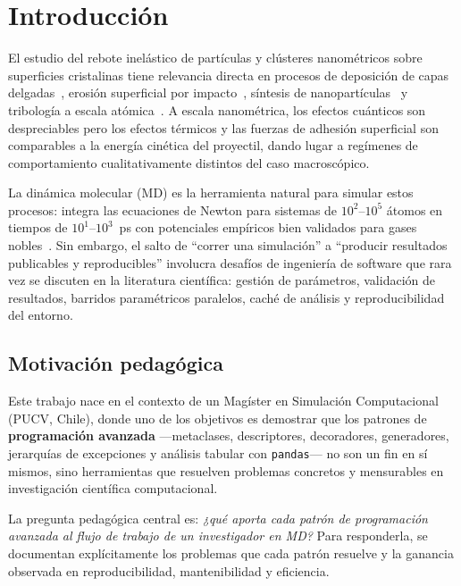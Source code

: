 \section{Introducción}

El estudio del rebote inelástico de partículas y clústeres nanométricos sobre
superficies cristalinas tiene relevancia directa en procesos de deposición de
capas delgadas~\cite{Yamaguchi1992}, erosión superficial por impacto~\cite{Zimmermann2021},
síntesis de nanopartículas~\cite{Kluge2020} y tribología a escala
atómica~\cite{Szlufarska2008}. A escala nanométrica, los efectos cuánticos son
despreciables pero los efectos térmicos y las fuerzas de adhesión superficial
son comparables a la energía cinética del proyectil, dando lugar a regímenes de
comportamiento cualitativamente distintos del caso macroscópico.

La dinámica molecular (MD) es la herramienta natural para simular estos procesos:
integra las ecuaciones de Newton para sistemas de $10^2$--$10^5$ átomos en
tiempos de $10^{1}$--$10^3$~ps con potenciales empíricos bien validados para
gases nobles~\cite{Lennard-Jones1931}. Sin embargo, el salto de ``correr una
simulación'' a ``producir resultados publicables y reproducibles'' involucra
desafíos de ingeniería de software que rara vez se discuten en la literatura
científica: gestión de parámetros, validación de resultados, barridos
paramétricos paralelos, caché de análisis y reproducibilidad del entorno.

\subsection{Motivación pedagógica}

Este trabajo nace en el contexto de un Magíster en Simulación Computacional
(PUCV, Chile), donde uno de los objetivos es demostrar que los patrones de
\textbf{programación avanzada} ---metaclases, descriptores, decoradores,
generadores, jerarquías de excepciones y análisis tabular con
\texttt{pandas}--- no son un fin en sí mismos, sino herramientas que resuelven
problemas concretos y mensurables en investigación científica computacional.

La pregunta pedagógica central es: \textit{¿qué aporta cada patrón de
programación avanzada al flujo de trabajo de un investigador en MD?} Para
responderla, se documentan explícitamente los problemas que cada patrón resuelve
y la ganancia observada en reproducibilidad, mantenibilidad y eficiencia.

